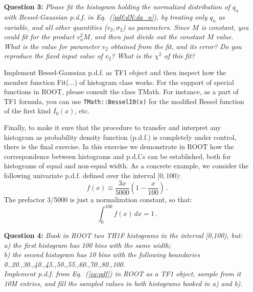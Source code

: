 \documentclass[11pt]{article}
\begin{document}
\bigskip
	
\noindent\textbf{Question 3:} {\it Please fit the histogram holding the normalized distribution of $q_n$ with Bessel-Gaussian p.d.f. in Eq.~(\ref{pdf:dN:dq_n}), by treating only $q_n$ as variable, and all other quantities ($v_2,\sigma_2$) as parameters. Since $M$ is constant, you could fit for the product $v_n^2 M$, and then just divide out the constant $M$ value. What is the value for parameter $v_2$ obtained from the fit, and its error? Do you reproduce the fixed input value of $v_2$? What is the $\chi^2$ of this fit?}

\bigskip
	 
 Implement Bessel-Gaussian p.d.f. as TF1 object and then inspect how the member function Fit(...) of histogram class works. For the support of special functions in ROOT, please consult the class TMath. For instance, as a part of TF1 formula, you can use \verb|TMath::BesselI0(x)| for the modified Bessel function of the first kind $I_{0}(x)$, etc. 

\bigskip
		
\noindent Finally, to make it sure that the procedure to transfer and interpret any histogram as probability density function (p.d.f.) is completely under control, there is the final exercise. In this exercise we demonstrate in ROOT how the correspondence between histograms and p.d.f.'s can be established, both for histograms of equal and non-equal width. As a concrete example, we consider the following univariate p.d.f. defined over the interval $[0,100)$: 
%
\begin{equation}
f(x) \equiv \frac{3x}{5000}\left(1-\frac{x}{100}\right)\,.
\label{eq:pdf}
\end{equation}
%
The prefactor 3/5000 is just a normalization constant, so that:
%
\begin{equation}
\int_0^{100} f(x)\,dx = 1\,.
\end{equation}
% 

\bigskip

\noindent\textbf{Question 4:} {\it Book in ROOT two TH1F histograms in the interval [0,100), but:\\
a) the first histogram has 100 bins with the same width;\\
b) the second histogram has 10 bins with the following boundaries {0.,20.,30.,40.,45.,50.,55.,60.,70.,80.,100.}\\
Implement p.d.f. from Eq.~(\ref{eq:pdf}) in ROOT as a TF1 object, sample from it 10M entries, and fill the sampled values in both histograms booked in a) and b).}
\end{document}

